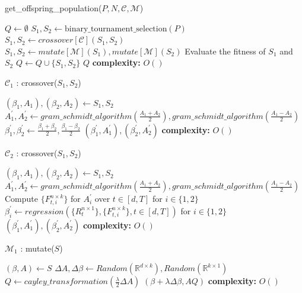 \begin{algorithm}[H]
\caption{get\_offspring\_population($P,N,\mathcal{C},\mathcal{M}$)}\label{nsga2:generate_offspring_population}
\begin{algorithmic}[1]
\State $Q \gets \emptyset$
\State $S_1, S_2 \gets \text{binary\_tournament\_selection}(P)$ 
\State $S_1, S_2 \gets crossover[\mathcal{C}](S_1,S_2) $
\EndIf
{}
\State $S_1, S_2 \gets mutate[\mathcal{M}](S_1),mutate[\mathcal{M}](S_2) $
\EndIf
\State Evaluate the fitness of $S_1$ and $S_2$
\State $Q \gets Q \cup \{S_1, S_2\}$
\EndFor
\State \Return $Q$
\State \textbf{complexity: } $O()$
\end{algorithmic}
\end{algorithm}
\begin{algorithm}[H]
\caption{$\mathcal{C}_1$ : crossover($S_1,S_2$)}\label{nsga2:crossover_1}
\begin{algorithmic}[1]
\State $(\beta_1, A_1), (\beta_2, A_2)\gets S_1, S_2$
\State $A^{'}_1, A^{'}_2\gets gram\_schmidt\_algorithm(\frac{A_1+A_2}{2}), gram\_schmidt\_algorithm(\frac{A_1-A_2}{2})$
\State $\beta^{'}_1, \beta^{'}_2 \gets \frac{\beta_1+\beta_2}{2}, \frac{\beta_1-\beta_2}{2}$
\State \Return $(\beta^{'}_1,A^{'}_1),(\beta^{'}_2,A^{'}_2)$
\State \textbf{complexity: } $O()$
\end{algorithmic}
\end{algorithm}
\begin{algorithm}[H]
\caption{$\mathcal{C}_2$ : crossover($S_1,S_2$)}\label{nsga2:crossover_1}
\begin{algorithmic}[1]
\State $(\beta_1, A_1), (\beta_2, A_2)\gets S_1, S_2$
\State $A^{'}_1, A^{'}_2\gets gram\_schmidt\_algorithm(\frac{A_1+A_2}{2}), gram\_schmidt\_algorithm(\frac{A_1-A_2}{2})$
\State Compute $\{F^{n\times k}_{t, i}\}$ for $A^{'}_i$ over $t\in [d,T]$ for $i\in \{1,2\}$
\State $\beta^{'}_i \gets regression(\{R^{n\times 1}_{t}\},\{F^{n\times k}_{t, i}\}, t\in [d,T])$ for $i\in \{1,2\}$
\State \Return $(\beta^{'}_1,A^{'}_1),(\beta^{'}_2,A^{'}_2)$
\State \textbf{complexity: } $O()$
\end{algorithmic}
\end{algorithm}
\begin{algorithm}[H]
\caption{$\mathcal{M}_1$ : mutate($S$)}\label{nsga2:mutate_1}
\begin{algorithmic}[1]
\State $(\beta, A)\gets S$
\State $\Delta A, \Delta \beta \gets Random(\mathbb{R}^{d\times k}),Random(\mathbb{R}^{k\times 1})$
\State $Q \gets cayley\_transformation(\frac{\lambda}{2} \Delta A)$
\State \Return $(\beta + \lambda \Delta \beta, AQ)$
\State \textbf{complexity: } $O()$
\end{algorithmic}
\end{algorithm}

